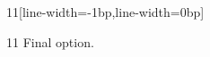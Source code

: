 \documentclass[paper=A4]{ropas-poster}
\begin{document}
\begin{postergrid}{1}{1}[line-width=-1bp,line-width=0bp]
\begin{posterblock}{1}{1}
Final option.
\end{posterblock}
\end{postergrid}
\end{document}
